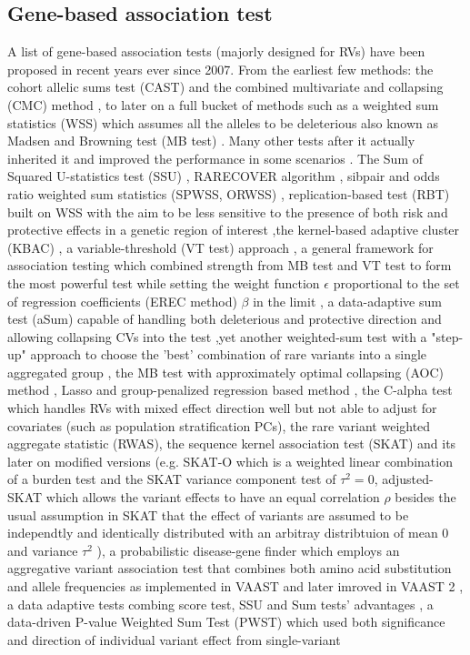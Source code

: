\documentclass[12pt]{article}
\begin{document}
\subsection*{Gene-based association test}
A list of gene-based association tests (majorly designed for RVs) have been proposed in recent years ever since 2007. From the earliest few methods: the cohort allelic sums test (CAST)\cite{Morgenthaler2007} and the combined multivariate and collapsing (CMC) method \cite{Li2008}, to later on a full bucket of methods such as a weighted sum statistics (WSS) which assumes all the alleles to be deleterious also known as Madsen and Browning test (MB test) \cite{Madsen2009}. Many other tests after it actually inherited it and improved the performance in some scenarios \cite{Hoffmann2010,Zhang2010,Ionita-Laza2011,Feng2011}. The Sum of Squared U-statistics test (SSU) \cite{Pan2009}, RARECOVER algorithm \cite{Bhatia2010}, sibpair and odds ratio weighted sum statistics (SPWSS, ORWSS) \cite{Zhu2010,Feng2011}, replication-based test (RBT) built on WSS with the aim to be less sensitive to the presence of both risk and protective effects in a genetic region of interest \cite{Ionita-Laza2011},the kernel-based adaptive cluster (KBAC) \cite{Liu2010}, a variable-threshold (VT test) approach \cite{Price2010}, a general framework for association testing which combined strength from MB test and VT test to form the most powerful test while setting the weight function $\epsilon$ proportional to the set of regression coefficients (EREC method) $\beta$ in the limit \cite{Lin2011},  a data-adaptive sum test (aSum) capable of handling both deleterious and protective direction and allowing collapsing CVs into the test \cite{Han2010},yet another weighted-sum test with a "step-up" approach to choose the 'best' combination of rare variants into a single aggregated group \cite{Hoffmann2010}, the MB test with approximately optimal collapsing (AOC) method \cite{Zhang2010}, Lasso and group-penalized regression based method \cite{Zhou2010}, the C-alpha test which handles RVs with mixed effect direction well but not able to adjust for covariates (such as population stratification PCs)\cite{Neale2011}, the rare variant weighted aggregate statistic (RWAS)\cite{Sul2011}, the sequence kernel association test (SKAT)\cite{Wu2011} and its later on modified versions (e.g. SKAT-O which is a weighted linear combination of a burden test and the SKAT variance component test of $\tau^2 = 0$, adjusted-SKAT which allows the variant effects to have an equal correlation $\rho$ besides the usual assumption in SKAT that the effect of variants are assumed to be independtly and identically distributed with an arbitray distribtuion of mean 0 and variance $\tau^2$  )\cite{Ionita-Laza2013,Oualkacha2013,Lee2012,Lee2012a}, a probabilistic disease-gene finder which employs an aggregative variant association test that combines both amino acid substitution and allele frequencies as implemented in VAAST \cite{Yandell2011} and later imroved in VAAST 2 \cite{Hu2013}, a data adaptive tests combing score test, SSU and Sum tests' advantages \cite{Pan2011}, a data-driven P-value Weighted Sum Test (PWST) which used both significance and direction of individual variant effect from single-variant 
\end{document}
